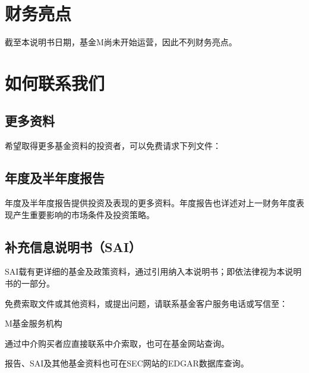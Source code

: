 \documentclass[UTF8,fontset=none,11pt,a4paper]{ctexart}
\begin{document}
\par{}\label{originalpage28}
\section*{财务亮点}\label{unitU951}
截至本说明书日期，基金M尚未开始运营，因此不列\allowbreak\mbox{财务亮点。}


\section*{如何联系我们}\label{unitU955}
\subsection*{更多资料}
希望取得更多基金资料的投资者，可以免费请求\allowbreak\mbox{下列文件：}

\subsection*{年度及半年度报告}
年度及半年度报告提供投资及表现的更多资料。年度报告也详述对上一财务年度表现产生重要影响的市场条件及\allowbreak\mbox{投资策略。}

\subsection*{补充信息说明书（SAI）}
SAI载有更详细的基金及政策资料，通过引用纳入本说明书；即依法律视为本说明书\allowbreak\mbox{的一部分。}

免费索取文件或其他资料，或提出问题，请联系基金客户服务电话或\allowbreak\mbox{写信至：}

\noindent M基金\allowbreak\mbox{服务机构}\par\smallskip
通过中介购买者应直接联系中介索取，也可在基金网\allowbreak\mbox{站查询。}


报告、SAI及其他基金资料也可在SEC网站的EDGAR数\allowbreak\mbox{据库查询。}
\end{document}
